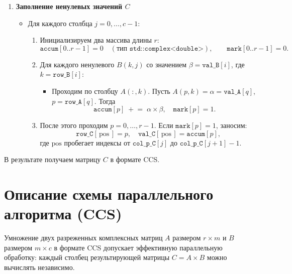 \documentclass[12pt]{article}
\begin{document}
\begin{enumerate}
    \item \textbf{Заполнение ненулевых значений \(C\)}
    \begin{itemize}
        \item Для каждого столбца \(j = 0, \dots, c-1\):
        \begin{enumerate}
            \item Инициализируем два массива длины \(r\):
            \[
                \texttt{accum}[0..r-1] = 0 \quad (\text{тип } \texttt{std::complex<double>}), \qquad
                \texttt{mark}[0..r-1] = 0.
            \]
            \item Для каждого ненулевого \(B(k,j)\) со значением \(\beta = \texttt{val\_B}[i]\), где \(k = \texttt{row\_B}[i]\):
            \begin{itemize}
                \item Проходим по столбцу \(A(:,k)\). Пусть \(A(p,k) = \alpha = \texttt{val\_A}[q]\), \(p = \texttt{row\_A}[q]\). Тогда
                \[
                    \texttt{accum}[p] \;\mathrel{+}= \;\alpha \times \beta, \quad \texttt{mark}[p] = 1.
                \]
            \end{itemize}
            \item После этого проходим \(p = 0, \dots, r-1\). Если \(\texttt{mark}[p] = 1\), заносим:
            \[
                \texttt{row\_C}[\,\text{pos}\,] = p,\quad
                \texttt{val\_C}[\,\text{pos}\,] = \texttt{accum}[p],
            \]
            где \(\text{pos}\) пробегает индексы от \(\texttt{col\_p\_C}[j]\) до \(\texttt{col\_p\_C}[j+1]-1\).
        \end{enumerate}
    \end{itemize}
\end{enumerate}

В результате получаем матрицу \(C\) в формате CCS.

\section{Описание схемы параллельного алгоритма (CCS)}

Умножение двух разреженных комплексных матриц \(A\) размером \(r \times m\) и \(B\) размером \(m \times c\) в формате CCS допускает эффективную параллельную обработку: каждый столбец результирующей матрицы \(C = A \times B\) можно вычислять независимо.
\end{document}
